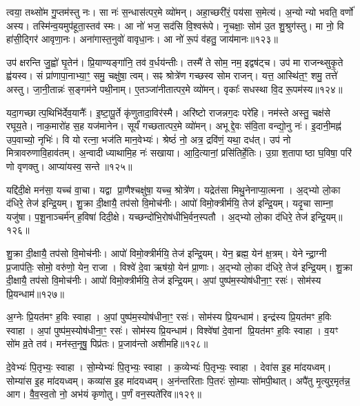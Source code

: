 त्वया॒ तथ्सो॑म गु॒प्तम॑स्तु नः।
सा नः॑ स॒न्धास॑त्पर॒मे व्यो॑मन्।
अहा॒च्छरी॑रं॒ पय॑सा स॒मेत्य॑।
अ॒न्योन्यो भवति॒ वर्णो॑ अस्य।
तस्मि॑न्व॒यमुप॑हूता॒स्तव॑ स्मः।
आ नो॑ भज॒ सद॑सि वि॒श्वरू॑पे।
नृ॒चक्षाः॒ सोम॑ उ॒त शु॒श्रुग॑स्तु।
मा नो॒ वि हा॑सी॒द्गिर॑ आवृणा॒नः।
अना॑गास्त॒नुवो॑ वावृधा॒नः।
आ नो॑ रू॒पं व॑हतु॒ जाय॑मानः॥१२३॥

उप॑ क्षरन्ति जु॒ह्वो॑ घृ॒तेन॑।
प्रि॒याण्यङ्गा॑नि॒ तव॑ व॒र्धय॑न्तीः।
तस्मै॑ ते सोम॒ नम॒ इद्वष॑ट्च।
उप॑ मा राजन्थ्सुकृ॒ते ह्व॑यस्व।
सं प्रा॑णापा॒नाभ्या॒ꣳ॒ समु॒ चक्षु॑षा॒ त्वम्।
सꣴ श्रोत्रे॑ण गच्छस्व सोम राजन्।
यत्त॒ आस्थि॑त॒ꣳ॒ शमु॒ तत्ते॑ अस्तु।
जा॒नी॒तान्नः॑ स॒ङ्गम॑ने पथी॒नाम्।
ए॒तञ्जा॑नीतात्पर॒मे व्यो॑मन्।
वृकाः᳚ सधस्था वि॒द रू॒पम॑स्य॥१२४॥

यदा॒गच्छात्प॒थिभि॑र्देव॒यानैः᳚।
इ॒ष्टा॒पू॒र्ते कृ॑णुतादा॒विर॑स्मै।
अरि॑ष्टो राजन्नग॒दः परे॑हि।
नम॑स्ते अस्तु॒ चक्ष॑से रघूय॒ते।
नाक॒मारो॑ह स॒ह यज॑मानेन।
सूर्यं॑ गच्छतात्पर॒मे व्यो॑मन्।
अभूद्दे॒वः स॑वि॒ता वन्द्यो॒नु नः॑।
इ॒दानी॒मह्न॑ उप॒वाच्यो॒ नृभिः॑।
वि यो रत्ना॒ भज॑ति मान॒वेभ्यः॑।
श्रेष्ठं॑ नो॒ अत्र॒ द्रवि॑णं॒ यथा॒ दध॑त्।
उप॑ नो मित्रावरुणावि॒हाव॑तम्।
अ॒न्वादीध्याथामि॒ह नः॑ सखाया।
आ॒दि॒त्यानां॒ प्रसि॑तिर्\mbox{}हे॒तिः।
उ॒ग्रा श॒तापाष्ठा घ॒विषा॒ परि॑ णो वृणक्तु।
आप्या॑यस्व॒ सन्ते॥१२५॥\anuvakamend[त्मना॒ जाय॑मानो\-ऽस्य॒ दध॒त्पञ्च॑ च]

यद्दि॑दी॒क्षे मन॑सा॒ यच्च॑ वा॒चा।
यद्वा प्रा॒णैश्चक्षु॑षा॒ यच्च॒ श्रोत्रे॑ण।
यद्रेत॑सा मिथु॒नेनाप्या॒त्मना।
अ॒द्भ्यो लो॒का द॑धिरे॒ तेज॑ इन्द्रि॒यम्।
शु॒क्रा दी॒क्षायै॒ तप॑सो वि॒मोच॑नीः।
आपो॑ विमो॒क्त्रीर्मयि॒ तेज॑ इन्द्रि॒यम्।
यदृ॒चा साम्ना॒ यजु॑षा।
प॒शू॒नाञ्चर्म॑न् ह॒विषा॑ दिदी॒क्षे।
यच्छन्दो॑भि॒रोष॑धीभि॒र्वन॒स्पतौ।
अ॒द्भ्यो लो॒का द॑धिरे॒ तेज॑ इन्द्रि॒यम्॥१२६॥

शु॒क्रा दी॒क्षायै॒ तप॑सो वि॒मोच॑नीः।
आपो॑ विमो॒क्त्रीर्मयि॒ तेज॑ इन्द्रि॒यम्।
येन॒ ब्रह्म॒ येन॑ क्ष॒त्रम्।
येनेन्द्रा॒ग्नी प्र॒जाप॑तिः॒ सोमो॒ वरु॑णो॒ येन॒ राजा।
विश्वे॑ दे॒वा ऋष॑यो॒ येन॑ प्रा॒णाः।
अ॒द्भ्यो लो॒का द॑धिरे॒ तेज॑ इन्द्रि॒यम्।
शु॒क्रा दी॒क्षायै॒ तप॑सो वि॒मोच॑नीः।
आपो॑ विमो॒क्त्रीर्मयि॒ तेज॑ इन्द्रि॒यम्।
अ॒पां पुष्प॑म॒स्योष॑धीना॒ꣳ॒ रसः॑।
सोम॑स्य प्रि॒यन्धाम॑॥१२७॥

अ॒ग्नेः प्रि॒यत॑मꣳ ह॒विः स्वाहा।
अ॒पां पुष्प॑म॒स्योष॑धीना॒ꣳ॒ रसः॑।
सोम॑स्य प्रि॒यन्धाम॑।
इन्द्र॑स्य प्रि॒यत॑मꣳ ह॒विः स्वाहा।
अ॒पां पुष्प॑म॒स्योष॑धीना॒ꣳ॒ रसः॑।
सोम॑स्य प्रि॒यन्धाम॑।
विश्वे॑षां दे॒वानां प्रि॒यत॑मꣳ ह॒विः स्वाहा।
व॒यꣳ सो॑म व्र॒ते तव॑।
मन॑स्त॒नूषु॒ पिप्र॑तः।
प्र॒जाव॑न्तो अशीमहि॥१२८॥

दे॒वेभ्यः॑ पि॒तृभ्यः॒ स्वाहा।
सो॒म्येभ्यः॑ पि॒तृभ्यः॒ स्वाहा।
क॒व्येभ्यः॑ पि॒तृभ्यः॒ स्वाहा।
देवा॑स इ॒ह मा॑दयध्वम्।
सोम्या॑स इ॒ह मा॑दयध्वम्।
कव्या॑स इ॒ह मा॑दयध्वम्।
अ॒न॑न्तरिताः पि॒तरः॑ सो॒म्याः सो॑मपी॒थात्।
अपै॑तु मृ॒त्युर॒मृत॑न्न॒ आग\sn{}।
वै॒व॒स्व॒तो नो॒ अभ॑यं कृणोतु।
प॒र्णं वन॒स्पते॑रिव॥१२९॥

